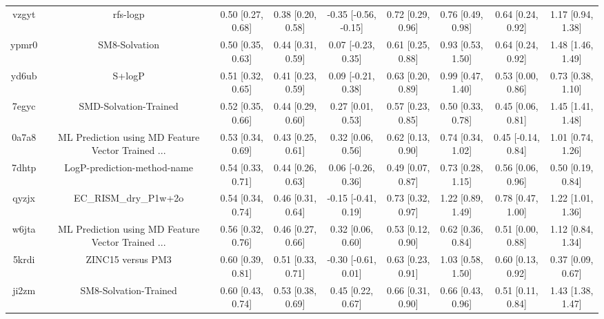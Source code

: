 \documentclass{article}
\begin{document}
\begin{center}
\begin{longtable}{|ccccccccc|}
 vzgyt &                                           rfs-logp &  0.50 [0.27, 0.68] &  0.38 [0.20, 0.58] &  -0.35 [-0.56, -0.15] &  0.72 [0.29, 0.96] &    0.76 [0.49, 0.98] &    0.64 [0.24, 0.92] &     1.17 [0.94, 1.38] \\
 ypmr0 &                                      SM8-Solvation &  0.50 [0.35, 0.63] &  0.44 [0.31, 0.59] &    0.07 [-0.23, 0.35] &  0.61 [0.25, 0.88] &    0.93 [0.53, 1.50] &    0.64 [0.24, 0.92] &     1.48 [1.46, 1.49] \\
 yd6ub &                                             S+logP &  0.51 [0.32, 0.65] &  0.41 [0.23, 0.59] &    0.09 [-0.21, 0.38] &  0.63 [0.20, 0.89] &    0.99 [0.47, 1.40] &    0.53 [0.00, 0.86] &     0.73 [0.38, 1.10] \\
 7egyc &                              SMD-Solvation-Trained &  0.52 [0.35, 0.66] &  0.44 [0.29, 0.60] &     0.27 [0.01, 0.53] &  0.57 [0.23, 0.85] &    0.50 [0.33, 0.78] &    0.45 [0.06, 0.81] &     1.45 [1.41, 1.48] \\
 0a7a8 &  ML Prediction using MD Feature Vector Trained ... &  0.53 [0.34, 0.69] &  0.43 [0.25, 0.61] &     0.32 [0.06, 0.56] &  0.62 [0.13, 0.90] &    0.74 [0.34, 1.02] &   0.45 [-0.14, 0.84] &     1.01 [0.74, 1.26] \\
 7dhtp &                        LogP-prediction-method-name &  0.54 [0.33, 0.71] &  0.44 [0.26, 0.63] &    0.06 [-0.26, 0.36] &  0.49 [0.07, 0.87] &    0.73 [0.28, 1.15] &    0.56 [0.06, 0.96] &     0.50 [0.19, 0.84] \\
 qyzjx &                              EC\_RISM\_dry\_P1w+2o &  0.54 [0.34, 0.74] &  0.46 [0.31, 0.64] &   -0.15 [-0.41, 0.19] &  0.73 [0.32, 0.97] &    1.22 [0.89, 1.49] &    0.78 [0.47, 1.00] &     1.22 [1.01, 1.36] \\
 w6jta &  ML Prediction using MD Feature Vector Trained ... &  0.56 [0.32, 0.76] &  0.46 [0.27, 0.66] &     0.32 [0.06, 0.60] &  0.53 [0.12, 0.90] &    0.62 [0.36, 0.84] &    0.51 [0.00, 0.88] &     1.12 [0.84, 1.34] \\
 5krdi &                                  ZINC15 versus PM3 &  0.60 [0.39, 0.81] &  0.51 [0.33, 0.71] &   -0.30 [-0.61, 0.01] &  0.63 [0.23, 0.91] &    1.03 [0.58, 1.50] &    0.60 [0.13, 0.92] &     0.37 [0.09, 0.67] \\
 ji2zm &                              SM8-Solvation-Trained &  0.60 [0.43, 0.74] &  0.53 [0.38, 0.69] &     0.45 [0.22, 0.67] &  0.66 [0.31, 0.90] &    0.66 [0.43, 0.96] &    0.51 [0.11, 0.84] &     1.43 [1.38, 1.47] \\

\end{longtable}
\end{center}
\end{document}
